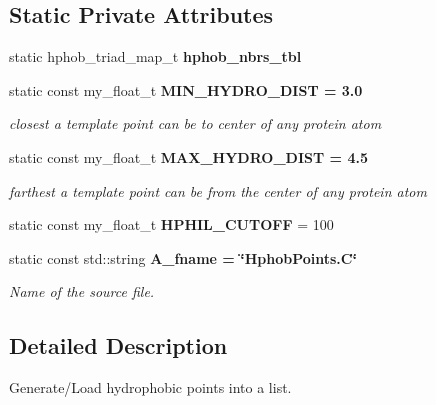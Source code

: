 \subsection*{Static Private Attributes}
\begin{CompactItemize}
\item 
static hphob\_\-triad\_\-map\_\-t \textbf{hphob\_\-nbrs\_\-tbl}\label{classASCbase_1_1HphobPoints_d3f1bba26bfaeb8e8db124fea2c9a646}

\item 
static const my\_\-float\_\-t \bf{MIN\_\-HYDRO\_\-DIST} = 3.0\label{classASCbase_1_1HphobPoints_5c0af7f8cf548ab24531b2fc4d154c56}

\begin{CompactList}\small\item\em closest a template point can be to center of any protein atom \item\end{CompactList}\item 
static const my\_\-float\_\-t \bf{MAX\_\-HYDRO\_\-DIST} = 4.5\label{classASCbase_1_1HphobPoints_39c4760c7bb2cc947393f964a14682cd}

\begin{CompactList}\small\item\em farthest a template point can be from the center of any protein atom \item\end{CompactList}\item 
static const my\_\-float\_\-t \textbf{HPHIL\_\-CUTOFF} = 100\label{classASCbase_1_1HphobPoints_f28d83c9e72324ac0c9e1879a83eb071}

\item 
static const std::string \bf{A\_\-fname} = \char`\"{}Hphob\-Points.C\char`\"{}\label{classASCbase_1_1HphobPoints_df2c547cffadaeb60355a7695a1a330b}

\begin{CompactList}\small\item\em Name of the source file. \item\end{CompactList}\end{CompactItemize}


\subsection{Detailed Description}
Generate/Load hydrophobic points into a list. 



